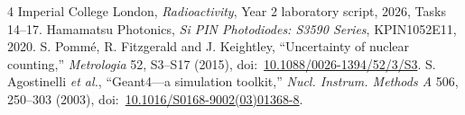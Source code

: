 \documentclass[journal,a4paper]{Imperial_lab_report}
\begin{document}
\clearpage
{}\label{sec:references}
\begin{thebibliography}{4}
 Imperial College London, \emph{Radioactivity}, Year 2 laboratory script, 2026, Tasks 14--17.
 Hamamatsu Photonics, \emph{Si PIN Photodiodes: S3590 Series}, KPIN1052E11, 2020.
 S. Pomm\'e, R. Fitzgerald and J. Keightley, ``Uncertainty of nuclear counting,'' \emph{Metrologia} 52, S3--S17 (2015), doi:~\href{https://doi.org/10.1088/0026-1394/52/3/S3}{10.1088/0026-1394/52/3/S3}.
 S. Agostinelli \emph{et al.}, ``Geant4---a simulation toolkit,'' \emph{Nucl. Instrum. Methods A} 506, 250--303 (2003), doi:~\href{https://doi.org/10.1016/S0168-9002(03)01368-8}{10.1016/S0168-9002(03)01368-8}.
\end{thebibliography}
\end{document}
